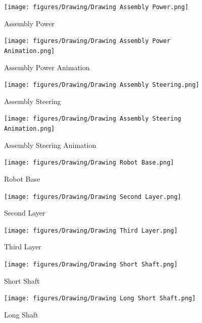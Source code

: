 \documentclass[12pt,a4paper]{article}
\begin{document}
\begin{figure}[H]
    \vspace{4cm}
    \centering
    \texttt{[image: figures/Drawing/Drawing Assembly Power.png]}
    \caption{Assembly Power}
\end{figure}

\begin{figure}[H]
    \vspace{4cm}
    \centering
    \texttt{[image: figures/Drawing/Drawing Assembly Power Animation.png]}
    \caption{Assembly Power Animation}
\end{figure}

\begin{figure}[H]
    \vspace{4cm}
    \centering
    \texttt{[image: figures/Drawing/Drawing Assembly Steering.png]}
    \caption{Assembly Steering}
\end{figure}

\begin{figure}[H]
    \vspace{4cm}
    \centering
    \texttt{[image: figures/Drawing/Drawing Assembly Steering Animation.png]}
    \caption{Assembly Steering Animation}
\end{figure}

\begin{figure}[H]
    \vspace{4cm}
    \centering
    \texttt{[image: figures/Drawing/Drawing Robot Base.png]}
    \caption{Robot Base}
\end{figure}

\begin{figure}[H]
    \vspace{4cm}
    \centering
    \texttt{[image: figures/Drawing/Drawing Second Layer.png]}
    \caption{Second Layer}
\end{figure}

\begin{figure}[H]
    \vspace{4cm}
    \centering
    \texttt{[image: figures/Drawing/Drawing Third Layer.png]}
    \caption{Third Layer}
\end{figure}

\begin{figure}[H]
    \vspace{4cm}
    \centering
    \texttt{[image: figures/Drawing/Drawing Short Shaft.png]}
    \caption{Short Shaft}
\end{figure}

\begin{figure}[H]
    \vspace{4cm}
    \centering
    \texttt{[image: figures/Drawing/Drawing Long Short Shaft.png]}
    \caption{Long Shaft}
\end{figure}
\end{document}
